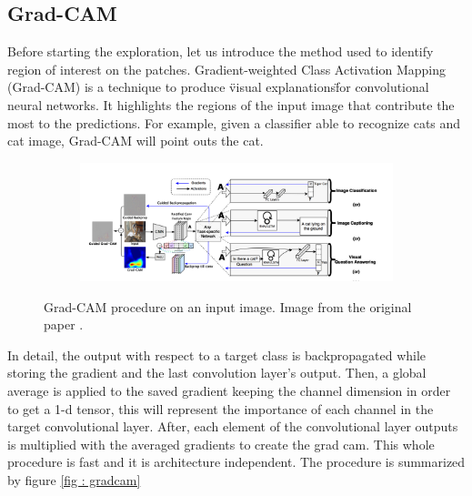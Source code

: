 \subsection{Grad-CAM}
Before starting the exploration, let us introduce the method used to identify region of interest on the patches. Gradient-weighted Class Activation Mapping (Grad-CAM) \cite{gradcam} is a technique to produce \"visual explanations\" for convolutional neural networks. It highlights the regions of the input image that contribute the most to the predictions. For example, given a classifier able to recognize cats and cat image, Grad-CAM will point outs the cat.
\begin{figure} [htbp]
    \centering
    \begin{subfigure}[b]{1\textwidth}
        \includegraphics[width=\linewidth]{../img/5/grad_cam1.png}
    \end{subfigure}
\caption{Grad-CAM procedure on an input image. Image from the original paper \cite{gradcam}.}
\label{fig: gradcam}
\end{figure}
In detail, the output with respect to a target class is backpropagated while storing the gradient and the last convolution layer's output. Then, a global average is applied to the saved gradient keeping the channel dimension in order to get a 1-d tensor, this will represent the importance of each channel in the target convolutional layer. After, each element of the convolutional layer outputs is multiplied with the averaged gradients to create the grad cam. This whole procedure is fast and it is architecture independent. The procedure is summarized by figure \ref{fig : gradcam}

